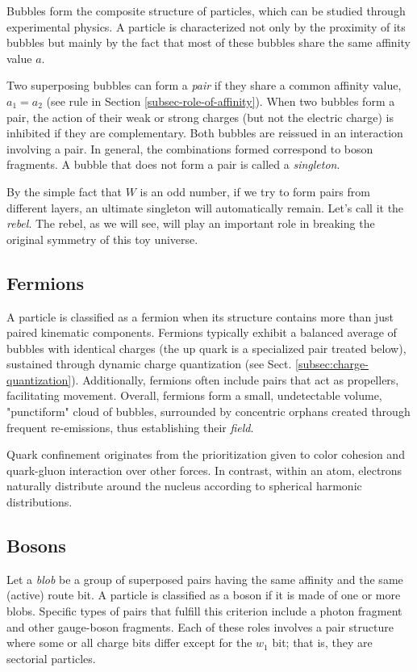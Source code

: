 \documentclass[12pt,english]{article}
\begin{document}
Bubbles form the composite structure of particles, which can be studied through experimental physics. A particle is characterized not only by the proximity of its bubbles but mainly by the fact that most of these bubbles share the same affinity value \( a \).

Two superposing bubbles can form a \emph{pair} if they share a common affinity value, $a_1 = a_2$ (see rule in Section \ref{subsec-role-of-affinity}). When two bubbles form a pair, the action of their weak or strong charges (but not the electric charge) is inhibited if they are complementary. Both bubbles are reissued in an interaction involving a pair. In general, the combinations formed correspond to boson fragments. A bubble that does not form a pair is called a \textit{singleton}.

By the simple fact that $W$ is an odd number, if we try to form pairs from different layers, an ultimate singleton will automatically remain. Let's call it the \textit{rebel}. The rebel, as we will see, will play an important role in breaking the original symmetry of this toy universe.

\subsection{Fermions}
A particle is classified as a fermion when its structure contains more than just paired kinematic components. Fermions typically exhibit a balanced average of bubbles with identical charges (the up quark is a specialized pair treated below), sustained through dynamic charge quantization (see Sect. \ref{subsec:charge-quantization}). Additionally, fermions often include pairs that act as propellers, facilitating movement. Overall, fermions form a small, undetectable volume, "punctiform" cloud of bubbles, surrounded by concentric orphans created through frequent re-emissions, thus establishing their \textit{field}.
 
Quark confinement originates from the prioritization given to color cohesion and quark-gluon interaction over other forces. In contrast, within an atom, electrons naturally distribute around the nucleus according to spherical harmonic distributions.

\subsection{Bosons}\label{bosons}
Let a \textit{blob} be a group of superposed pairs having the same affinity and the same (active) route bit.
A particle is classified as a boson if it is made of one or more blobs. Specific types of pairs that fulfill this criterion include a photon fragment and other gauge-boson fragments. Each of these roles involves a pair structure where some or all charge bits differ except for the $w_{1}$ bit; that is, they are sectorial particles. 
\end{document}
